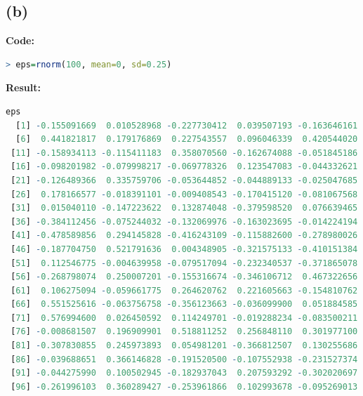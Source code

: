 \documentclass[twoside]{homework}
\begin{document}
\subsection*{(b)}
\textbf{Code:}
\begin{lstlisting}[language=R]
> eps=rnorm(100, mean=0, sd=0.25)
\end{lstlisting}
\textbf{Result:}
\begin{lstlisting}[language=R]
eps
  [1] -0.155091669  0.010528968 -0.227730412  0.039507193 -0.163646161
  [6]  0.441821817  0.179176869  0.227543557  0.096046339  0.420544020
 [11] -0.158934113 -0.115411183  0.358070560 -0.162674088 -0.051845186
 [16] -0.098201982 -0.079998217 -0.069778326  0.123547083 -0.044332621
 [21] -0.126489366  0.335759706 -0.053644852 -0.044889133 -0.025047685
 [26]  0.178166577 -0.018391101 -0.009408543 -0.170415120 -0.081067568
 [31]  0.015040110 -0.147223622  0.132874048 -0.379598520  0.076639465
 [36] -0.384112456 -0.075244032 -0.132069976 -0.163023695 -0.014224194
 [41] -0.478589856  0.294145828 -0.416243109 -0.115882600 -0.278980026
 [46] -0.187704750  0.521791636  0.004348905 -0.321575133 -0.410151384
 [51]  0.112546775 -0.004639958 -0.079517094 -0.232340537 -0.371865078
 [56] -0.268798074  0.250007201 -0.155316674 -0.346106712  0.467322656
 [61]  0.106275094 -0.059661775  0.264620762  0.221605663 -0.154810762
 [66]  0.551525616 -0.063756758 -0.356123663 -0.036099900  0.051884585
 [71]  0.576994600  0.026450592  0.114249701 -0.019288234 -0.083500211
 [76] -0.008681507  0.196909901  0.518811252  0.256848110  0.301977100
 [81] -0.307830855  0.245973893  0.054981201 -0.366812507  0.130255686
 [86] -0.039688651  0.366146828 -0.191520500 -0.107552938 -0.231527374
 [91] -0.044275990  0.100502945 -0.182937043  0.207593292 -0.302020697
 [96] -0.261996103  0.360289427 -0.253961866  0.102993678 -0.095269013
\end{lstlisting}
\end{document}
